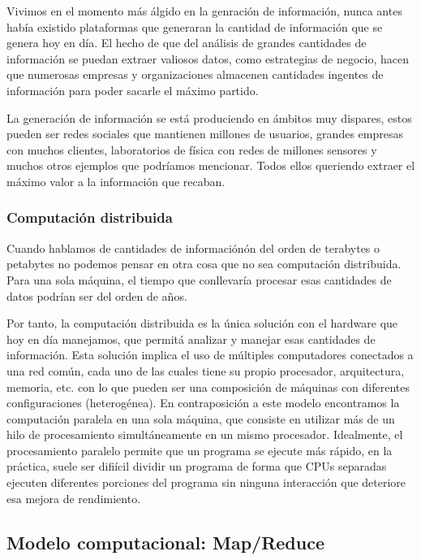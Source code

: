 Vivimos en el momento m\'as \'algido en la genraci\'on de informaci\'on, nunca antes había existido plataformas que generaran la cantidad de información que se genera hoy en d\'ia. El hecho de que del análisis de grandes cantidades de información se puedan extraer valiosos datos, como estrategias de negocio, hacen que numerosas empresas y organizaciones almacenen cantidades ingentes de información para poder sacarle el máximo partido.

La generaci\'on de informaci\'on se est\'a produciendo en \'ambitos muy dispares, estos pueden ser redes sociales que mantienen millones de usuarios, grandes empresas con muchos clientes, laboratorios de f\'isica con redes de millones sensores y muchos otros ejemplos que podríamos mencionar. Todos ellos queriendo extraer el máximo valor a la información que recaban.

\subsubsection{Computaci\'on distribuida}

Cuando hablamos de cantidades de información\'on del orden de terabytes o petabytes no podemos pensar en otra cosa que no sea computación distribuida. Para una sola m\'aquina, el tiempo que conllevar\'ia procesar esas cantidades de datos podr\'ian ser del orden de a\~nos.

Por tanto, la computaci\'on distribuida es la \'unica soluci\'on con el hardware que hoy en d\'ia manejamos, que permit\'a analizar y manejar esas cantidades de información. Esta soluci\'on implica el uso de m\'ultiples computadores conectados a una red común, cada uno de las cuales tiene su propio procesador, arquitectura, memoria, etc. con lo que pueden ser una composición de m\'aquinas con diferentes configuraciones (heterog\'enea). En contraposici\'on a este modelo encontramos la computaci\'on paralela en una sola m\'aquina, que consiste en utilizar m\'as de un hilo de procesamiento simult\'aneamente en un mismo procesador. Idealmente, el procesamiento paralelo permite que un programa se ejecute m\'as r\'apido, en la pr\'actica, suele ser difi\'icil dividir un programa de forma que CPUs separadas ejecuten diferentes porciones del programa sin ninguna interacci\'on que deteriore esa mejora de rendimiento.

\subsection{Modelo computacional: Map/Reduce}

